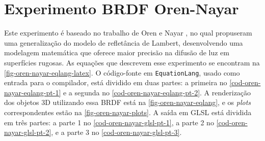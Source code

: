 
\section{Experimento BRDF Oren-Nayar} \label{section-experiment-oren-nayar}

Este experimento é baseado no trabalho de Oren e Nayar \cite{oren1994generalization}, no qual propuseram uma generalização do modelo de refletância de Lambert, desenvolvendo uma modelagem matemática que oferece maior precisão na difusão de luz em superfícies rugosas. As equações que descrevem esse experimento se encontram na \autoref{fig-oren-nayar-eqlang-latex}. O código-fonte em \texttt{EquationLang}, usado como entrada para o compilador, está dividido em duas partes: a primeira no \autoref{cod-oren-nayar-eqlang-pt-1} e a segunda no \autoref{cod-oren-nayar-eqlang-pt-2}. A renderização dos objetos 3D utilizando essa BRDF está na \autoref{fig-oren-nayar-eqlang}, e os \textit{plots} correspondentes estão na \autoref{fig-oren-nayar-plots}. A saída em GLSL está dividida em três partes: a parte 1 no \autoref{cod-oren-nayar-glsl-pt-1}, a parte 2 no \autoref{cod-oren-nayar-glsl-pt-2}, e a parte 3 no \autoref{cod-oren-nayar-glsl-pt-3}.


